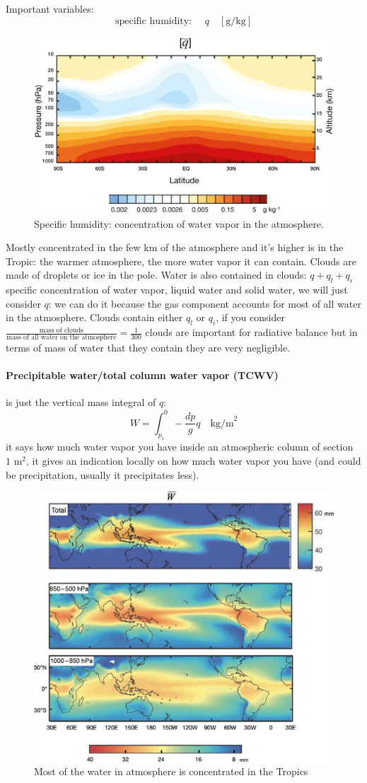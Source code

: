Important variables:
\[\text{specific humidity: }\quad q \quad [\text{g/kg}]\]
\begin{figure}[htpb]
    \centering
    \includegraphics[width=0.5\linewidth]{uploads/specific humidity.png}
    \caption{Specific humidity: concentration of water vapor in the atmosphere.}
    \label{fig:q}
\end{figure}
Mostly concentrated in the few km of the atmosphere and it's higher is in the Tropic: the warmer atmosphere, the more water vapor it can contain. Clouds are made of droplets or ice in the pole. Water is also contained in clouds: $q+q_l+q_i$ specific concentration of water vapor, liquid water and solid water, we will just consider $q$: we can do it because the gas component accounts for most of all water in the atmosphere. 
Clouds contain either $q_l$ or $q_i$, if you consider $\displaystyle\frac{\text{mass of clouds}}{\text{mass of all water on the atmosphere}}=\frac{1}{300}$
clouds are important for radiative balance but in terms of mass of water that they contain they are very negligible.
\paragraph{Precipitable water/total column water vapor (TCWV)} is just the vertical mass integral of $q$:
\begin{equation}
    W=\int_{p_s}^{0}-\frac{dp}{g}q\quad\text{kg/m}^2
\end{equation}
it says how much water vapor you have inside an atmospheric column of section $1\text{ m}^2$, it gives an indication locally on how much water vapor you have (and could be precipitation, usually it precipitates less).
\begin{figure}[h]
    \centering
    \includegraphics[width=0.5\linewidth]{uploads/W.png}
    \caption{Most of the water in atmosphere is concentrated in the Tropics}
    \label{fig:W}
\end{figure}
